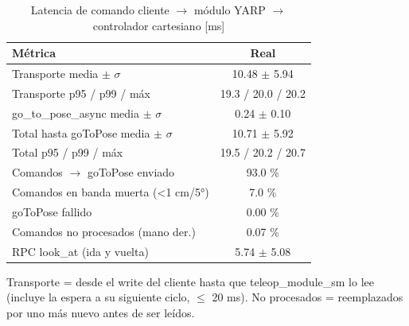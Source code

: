 \begin{table}[htbp]
\centering\small
\caption{Latencia de comando cliente $\rightarrow$ módulo YARP $\rightarrow$ controlador cartesiano [ms]}
\begin{tabular}{lc}
\toprule
Métrica & Real \\
\midrule
Transporte media $\pm$ $\sigma$ & 10.48 $\pm$ 5.94 \\
Transporte p95 / p99 / máx & 19.3 / 20.0 / 20.2 \\
go\_to\_pose\_async media $\pm$ $\sigma$ & 0.24 $\pm$ 0.10 \\
Total hasta goToPose media $\pm$ $\sigma$ & 10.71 $\pm$ 5.92 \\
Total p95 / p99 / máx & 19.5 / 20.2 / 20.7 \\
Comandos $\rightarrow$ goToPose enviado & 93.0 \% \\
Comandos en banda muerta (<1 cm/5°) & 7.0 \% \\
goToPose fallido & 0.00 \% \\
Comandos no procesados (mano der.) & 0.07 \% \\
RPC look\_at (ida y vuelta) & 5.74 $\pm$ 5.08 \\
\bottomrule
\end{tabular}
\par\footnotesize Transporte = desde el write del cliente hasta que teleop\_module\_sm lo lee (incluye la espera a su siguiente ciclo, $\leq$ 20 ms). No procesados = reemplazados por uno más nuevo antes de ser leídos.
\end{table}


